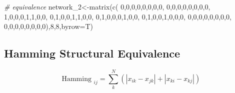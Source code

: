 \documentclass[
  notitlepage,
  onecolumn,
  openany]{book}
\newenvironment{Shaded}{\begin{snugshade}}{\end{snugshade}}
\newcommand{\AttributeTok}[1]{\textcolor[rgb]{0.77,0.63,0.00}{#1}}
\newcommand{\CommentTok}[1]{\textcolor[rgb]{0.56,0.35,0.01}{\textit{#1}}}
\newcommand{\DecValTok}[1]{\textcolor[rgb]{0.00,0.00,0.81}{#1}}
\newcommand{\FunctionTok}[1]{\textcolor[rgb]{0.00,0.00,0.00}{#1}}
\newcommand{\NormalTok}[1]{#1}
\newcommand{\OtherTok}[1]{\textcolor[rgb]{0.56,0.35,0.01}{#1}}
\begin{document}
\begin{Shaded}
\begin{Highlighting}[]
\CommentTok{\# equivalence}
\NormalTok{network\_2}\OtherTok{\textless{}{-}}\FunctionTok{matrix}\NormalTok{(}\FunctionTok{c}\NormalTok{(}
  \DecValTok{0}\NormalTok{,}\DecValTok{0}\NormalTok{,}\DecValTok{0}\NormalTok{,}\DecValTok{0}\NormalTok{,}\DecValTok{0}\NormalTok{,}\DecValTok{0}\NormalTok{,}\DecValTok{0}\NormalTok{,}\DecValTok{0}\NormalTok{,}
  \DecValTok{0}\NormalTok{,}\DecValTok{0}\NormalTok{,}\DecValTok{0}\NormalTok{,}\DecValTok{0}\NormalTok{,}\DecValTok{0}\NormalTok{,}\DecValTok{0}\NormalTok{,}\DecValTok{0}\NormalTok{,}\DecValTok{0}\NormalTok{,}
  \DecValTok{1}\NormalTok{,}\DecValTok{0}\NormalTok{,}\DecValTok{0}\NormalTok{,}\DecValTok{0}\NormalTok{,}\DecValTok{1}\NormalTok{,}\DecValTok{1}\NormalTok{,}\DecValTok{0}\NormalTok{,}\DecValTok{0}\NormalTok{,}
  \DecValTok{0}\NormalTok{,}\DecValTok{1}\NormalTok{,}\DecValTok{0}\NormalTok{,}\DecValTok{0}\NormalTok{,}\DecValTok{1}\NormalTok{,}\DecValTok{1}\NormalTok{,}\DecValTok{0}\NormalTok{,}\DecValTok{0}\NormalTok{,}
  \DecValTok{0}\NormalTok{,}\DecValTok{1}\NormalTok{,}\DecValTok{0}\NormalTok{,}\DecValTok{0}\NormalTok{,}\DecValTok{0}\NormalTok{,}\DecValTok{1}\NormalTok{,}\DecValTok{0}\NormalTok{,}\DecValTok{0}\NormalTok{,}
  \DecValTok{0}\NormalTok{,}\DecValTok{1}\NormalTok{,}\DecValTok{0}\NormalTok{,}\DecValTok{0}\NormalTok{,}\DecValTok{1}\NormalTok{,}\DecValTok{0}\NormalTok{,}\DecValTok{0}\NormalTok{,}\DecValTok{0}\NormalTok{,}
  \DecValTok{0}\NormalTok{,}\DecValTok{0}\NormalTok{,}\DecValTok{0}\NormalTok{,}\DecValTok{0}\NormalTok{,}\DecValTok{0}\NormalTok{,}\DecValTok{0}\NormalTok{,}\DecValTok{0}\NormalTok{,}\DecValTok{0}\NormalTok{,}
  \DecValTok{0}\NormalTok{,}\DecValTok{0}\NormalTok{,}\DecValTok{0}\NormalTok{,}\DecValTok{0}\NormalTok{,}\DecValTok{0}\NormalTok{,}\DecValTok{0}\NormalTok{,}\DecValTok{0}\NormalTok{,}\DecValTok{0}\NormalTok{),}\DecValTok{8}\NormalTok{,}\DecValTok{8}\NormalTok{,}\AttributeTok{byrow=}\NormalTok{T)}
\end{Highlighting}
\end{Shaded}

\hypertarget{hamming-structural-equivalence}{%
\subsection{Hamming Structural Equivalence}\label{hamming-structural-equivalence}}

\[
\text { Hamming }_{i j}=\sum_{k}^{N}\left(\left|x_{i k}-x_{j k}\right|+\left|x_{k i}-x_{k j}\right|\right)
\]
\end{document}
